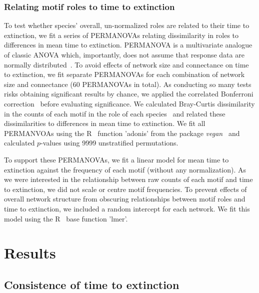 \documentclass[12pt]{article}
\begin{document}
		\subsubsection*{Relating motif roles to time to extinction}

			To test whether species' overall, un-normalized roles are related to their time to extinction, we fit a series of PERMANOVAs relating dissimilarity in roles to differences in mean time to extinction.
			PERMANOVA is a multivariate analogue of classic ANOVA which, importantly, does not assume that response data are normally distributed~\citep{Anderson2001}.
			To avoid effects of network size and connectance on time to extinction, we fit separate PERMANOVAs for each combination of network size and connectance (60 PERMANOVAs in total).
			As conducting so many tests risks obtaining significant results by chance, we applied the correlated Bonferroni correction~\citep{Drezner2016} before evaluating significance.
			We calculated Bray-Curtis dissimilarity in the counts of each motif in the role of each species~\citep{Baker2015,Cirtwill2015} and related these dissimilarities to differences in mean time to extinction.
			We fit all PERMANVOAs using the R~\citep{R} function 'adonis' from the package \emph{vegan}~\citep{vegan} and calculated $p$-values using 9999 unstratified permutations.


			To support these PERMANOVAs, we fit a linear model for mean time to extinction against the frequency of each motif (without any normalization).
			As we were interested in the relationship between raw counts of each motif and time to extinction, we did not scale or centre motif frequencies.
			To prevent effects of overall network structure from obscuring relationships between motif roles and time to extinction, we included a random intercept for each network.
			We fit this model using the R~\citep{R} base function 'lmer'.


\section{Results}
	
	\subsection*{Consistence of time to extinction}
\end{document}
